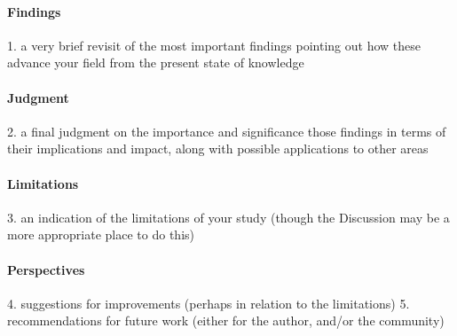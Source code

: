 
\paragraph{Findings}
1. a very brief revisit of the most important findings pointing out how these
advance your field from the present state of knowledge
\paragraph{Judgment}
2. a final judgment on the importance and significance those findings in terms of
their implications and impact, along with possible applications to other areas
\paragraph{Limitations}
3. an indication of the limitations of your study (though the Discussion may be
a more appropriate place to do this)
\paragraph{Perspectives}
4. suggestions for improvements (perhaps in relation to the limitations)
5. recommendations for future work (either for the author, and/or the community)
